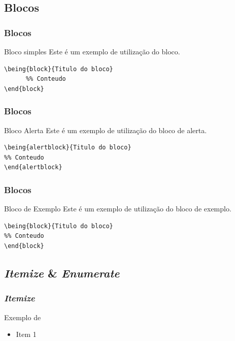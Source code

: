 \documentclass[compress]{beamer}
\begin{document}
\subsection{Blocos}


\begin{frame}[fragile]
  \frametitle{Blocos}
  \begin{block}{Bloco simples}
    Este é um exemplo de utilização do bloco.
\begin{lstlisting}
\being{block}{Titulo do bloco}
      %% Conteudo
\end{block}
\end{lstlisting}
  \end{block}
\end{frame}


\begin{frame}[fragile]
  \frametitle{Blocos}
  \begin{alertblock}{Bloco Alerta}
    Este é um exemplo de utilização do bloco de alerta.
\begin{lstlisting}
\being{alertblock}{Titulo do bloco}
%% Conteudo
\end{alertblock}
\end{lstlisting}
  \end{alertblock}
\end{frame}


\begin{frame}[fragile]
  \frametitle{Blocos}
  \begin{exampleblock}{Bloco de Exemplo}
    Este é um exemplo de utilização do bloco de exemplo.
\begin{lstlisting}
\being{block}{Titulo do bloco}
%% Conteudo
\end{block}
\end{lstlisting}
  \end{exampleblock}
\end{frame}


\subsection{\emph{Itemize} \& \emph{Enumerate}}


\begin{frame}
  \frametitle{\emph{Itemize}}

  Exemplo de 
  \begin{itemize}
  \item Item 1
  \end{itemize}
\end{frame}
\end{document}
